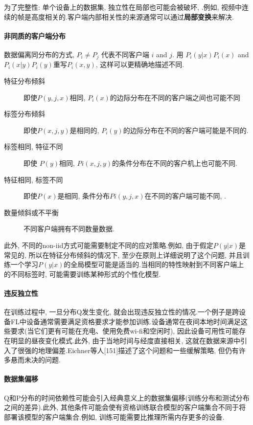 \documentclass[a4paper]{article}
\begin{document}
为了完整性: 单个设备上的数据集,  独立性在局部也可能会被破坏, .例如, 视频中连续的帧是高度相关的.客户端内部相关性的来源通常可以通过\textbf{局部变换}来解决.

\paragraph{非同质的客户端分布}
数据偏离同分布的方式\citep{hsieh2019non},     $P_i \neq P_j$ 代表不同客户端 $i$ and $j$. 用 $P_i(y | x) P_i(x)$ and $P_i(x | y) P_i(y) $重写$P_i(x,  y)$, 这样可以更精确地描述不同.
\begin{description}
\item[特征分布倾斜] 即使$P(y, j, x)$相同,  $P_i(x)$的边际分布在不同的客户端之间也可能不同
\item[标签分布倾斜] 即使$P(x,  j,  y)$是相同的, $P_i(y)$的边际分布在不同的客户端可能是不同的.
\item[标签相同, 特征不同] 即使 $P(y)$相同,  $Pi(x, j, y)$的条件分布在不同的客户机上也可能不同. 
\item[特征相同, 标签不同] 即使$P(x)$是相同,  条件分布$Pi(y, j, x)$在不同的客户端可能不同, .
\item[数量倾斜或不平衡]不同客户端拥有不同数量数据. 
\end{description}

此外, 不同的non-iid方式可能需要制定不同的应对策略.例如, 由于假定$P(y | x)$是常见的, 所以在特征分布倾斜的情况下, 至少在原则上详细说明了这个问题, 并且训练一个学习$P(y | x)$的全局模型可能是适当的.当相同的特性映射到不同客户端上的不同标签时, 可能需要训练某种形式的个性化模型.

\paragraph{违反独立性}
在训练过程中, 一旦分布Q发生变化, 就会出现违反独立性的情况.一个例子是跨设备FL中设备通常需要满足资格要求才能参加训练.设备通常在夜间本地时间满足这些要求(当它们更有可能在充电、使用免费wi-fi和空闲时), 因此设备可用性可能存在明显的昼夜变化模式.此外, 由于当地时间与经度直接相关, 这就在数据来源中引入了很强的地理偏差.Eichner等人[151]描述了这个问题和一些缓解策略, 但仍有许多悬而未决的问题.

\paragraph{数据集偏移}
Q和P分布的时间依赖性可能会引入经典意义上的数据集偏移(训练分布和测试分布之间的差异).此外, 其他条件可能会使有资格训练联合模型的客户端集合不同于将部署该模型的客户端集合.例如, 训练可能需要比推理所需内存更多的设备. 
\end{document}
